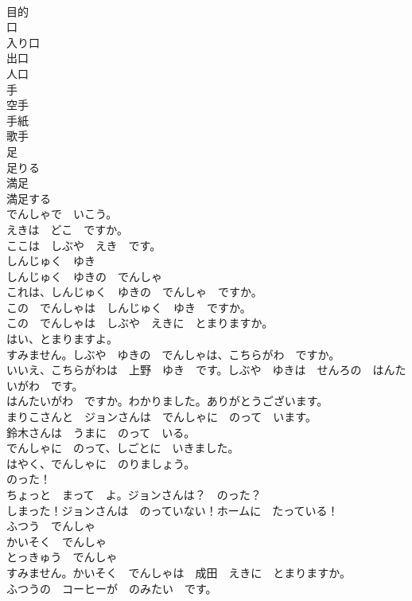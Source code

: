 \documentclass[8pt]{extreport}
\begin{document}
\begin{CJK}{UTF8}{min}
\\	目的	
\\	口	
\\	入り口	
\\	出口	
\\	人口	
\\	手	
\\	空手	
\\	手紙	
\\	歌手	
\\	足	
\\	足りる	
\\	満足	
\\	満足する	
\\	でんしゃで　いこう。	
\\	えきは　どこ　ですか。	
\\	ここは　しぶや　えき　です。	
\\	しんじゅく　ゆき	
\\	しんじゅく　ゆきの　でんしゃ	
\\	これは、しんじゅく　ゆきの　でんしゃ　ですか。	
\\	この　でんしゃは　しんじゅく　ゆき　ですか。	
\\	この　でんしゃは　しぶや　えきに　とまりますか。	
\\	はい、とまりますよ。	
\\	すみません。しぶや　ゆきの　でんしゃは、こちらがわ　ですか。	
\\	いいえ、こちらがわは　上野　ゆき　です。しぶや　ゆきは　せんろの　はんたいがわ　です。	
\\	はんたいがわ　ですか。わかりました。ありがとうございます。	
\\	まりこさんと　ジョンさんは　でんしゃに　のって　います。	
\\	鈴木さんは　うまに　のって　いる。	
\\	でんしゃに　のって、しごとに　いきました。	
\\	はやく、でんしゃに　のりましょう。	
\\	のった！	
\\	ちょっと　まって　よ。ジョンさんは？　のった？	
\\	しまった！ジョンさんは　のっていない！ホームに　たっている！	
\\	ふつう　でんしゃ	
\\	かいそく　でんしゃ	
\\	とっきゅう　でんしゃ	
\\	すみません。かいそく　でんしゃは　成田　えきに　とまりますか。	
\\	ふつうの　コーヒーが　のみたい　です。	

\end{CJK}
\end{document}
